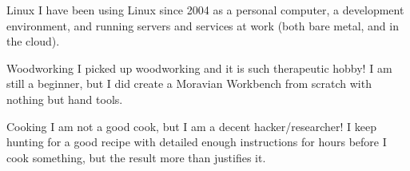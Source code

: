 



\begin{cvskills}

  \cvskill
    {Linux} %
    {I have been using Linux since 2004 as a personal computer, a development environment, and running servers and services at work (both bare metal, and in the cloud).} %

  \cvskill
    {Woodworking} %
    {I picked up woodworking and it is such therapeutic hobby! I am still a beginner, but I did create a Moravian Workbench from scratch with nothing but hand tools.} %


  \cvskill
    {Cooking} %
    {I am not a good cook, but I am a decent hacker/researcher! I keep hunting for a good recipe with detailed enough instructions for hours before I cook something, but the result more than justifies it.} %

\end{cvskills}
